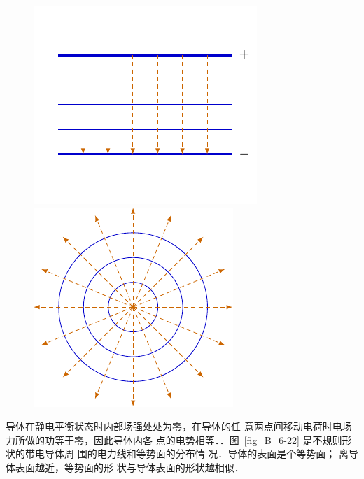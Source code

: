 \begin{figure}[htbp]
	\centering
	\begin{minipage}[t]{0.48\textwidth}
		\centering
		\includegraphics{fig/B/6-19.pdf}
		\caption{}\label{fig_B_6-19}
	\end{minipage}
	\begin{minipage}[t]{0.48\textwidth}
		\centering
		\includegraphics{fig/B/6-20.pdf}
		\caption{}\label{fig_B_6-20}
	\end{minipage}
\end{figure}



导体在静电平衡状态时内部场强处处为零，在导体的任
意两点间移动电荷时电场力所做的功等于零，因此导体内各
点的电势相等．．图~\ref{fig_B_6-22} 
是不规则形状的带电导体周
围的电力线和等势面的分布情
况．导体的表面是个等势面；
离导体表面越近，等势面的形
状与导体表面的形状越相似．

